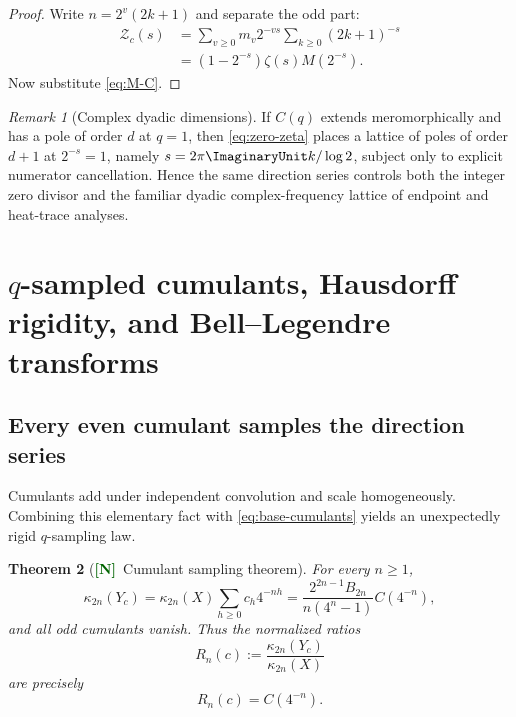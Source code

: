 \documentclass[11pt]{article}
\numberwithin{equation}{section}
\newtheorem{theorem}{Theorem}[section]
\theoremstyle{definition}
\theoremstyle{remark}
\newtheorem{remark}[theorem]{Remark}
\newcommand{\New}{\textcolor{darkgreen}{\textsf{\textbf{[N]}}}}
\begin{document}
\begin{proof}
Write $n=2^v(2k+1)$ and separate the odd part:
\begin{align*}
 \mathcal Z_c(s)
 &=\sum_{v\ge0}m_v2^{-vs}
   \sum_{k\ge0}(2k+1)^{-s}\\
 &=(1-2^{-s})\zeta(s)M(2^{-s}).
\end{align*}
Now substitute \eqref{eq:M-C}.
\end{proof}

\begin{remark}[Complex dyadic dimensions]
If $C(q)$ extends meromorphically and has a pole of order $d$ at $q=1$, then
\eqref{eq:zero-zeta} places a lattice of poles of order $d+1$ at
$2^{-s}=1$, namely $s=2\pi\ImaginaryUnit k/\log2$, subject only to explicit numerator
cancellation.  Hence the same direction series controls both the integer zero
divisor and the familiar dyadic complex-frequency lattice of endpoint and
heat-trace analyses.
\end{remark}

\section{$q$-sampled cumulants, Hausdorff rigidity, and Bell--Legendre transforms}
\label{sec:cumulants}

\subsection{Every even cumulant samples the direction series}

Cumulants add under independent convolution and scale homogeneously.  Combining
this elementary fact with \eqref{eq:base-cumulants} yields an unexpectedly
rigid $q$-sampling law.

\begin{theorem}[\New\ Cumulant sampling theorem]
\label{thm:cumulant-sampling}
For every $n\ge1$,
\begin{equation}
 \kappa_{2n}(Y_c)
 =\kappa_{2n}(X)\sum_{h\ge0}c_h4^{-nh}
 =\frac{2^{2n-1}B_{2n}}{n(4^n-1)}C(4^{-n}),
 \label{eq:cumulant-sampling}
\end{equation}
and all odd cumulants vanish.  Thus the normalized ratios
\begin{equation}
 R_n(c):=\frac{\kappa_{2n}(Y_c)}{\kappa_{2n}(X)}
 \label{eq:Rn}
\end{equation}
are precisely
\begin{equation}
 \boxed{\ R_n(c)=C(4^{-n}).\ }
 \label{eq:Rn-C}
\end{equation}
\end{theorem}
\end{document}
